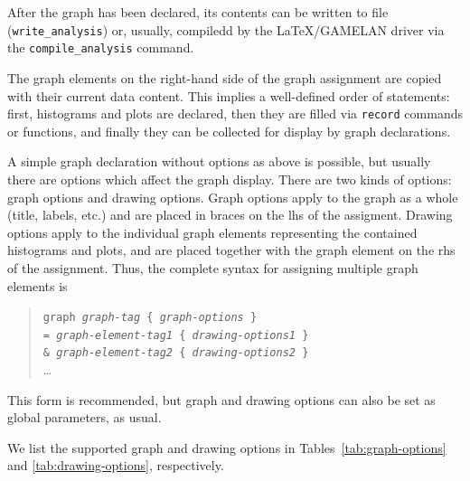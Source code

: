 \documentclass[12pt]{book}
\newcommand{\ttt}[1]{\texttt{#1}}
\begin{document}
After the graph has been declared, its contents can be written to file
(\ttt{write\_analysis}) or, usually, compiledd by the \LaTeX/GAMELAN driver
via the \ttt{compile\_analysis} command.

The graph elements on the right-hand side of the graph assignment are copied
with their current data content.  This implies a well-defined order of
statements: first, histograms and plots are declared, then they are filled via
\ttt{record} commands or functions, and finally they can be collected for
display by graph declarations.

A simple graph declaration without options as above is possible, but usually
there are options which affect the graph display.  There are two kinds of
options: graph options and drawing options.  Graph options apply to the graph
as a whole (title, labels, etc.) and are placed in braces on the lhs of the
assigment.  Drawing options apply to the individual graph elements
representing the contained histograms and plots, and are placed together with
the graph element on the rhs of the assignment.  Thus, the complete syntax for
assigning multiple graph elements is
\begin{quote}
  \begin{footnotesize}
    \ttt{graph \emph{graph-tag} \{ \emph{graph-options} \}}
\\
    \ttt{= \emph{graph-element-tag1} \{ \emph{drawing-options1} \}}
\\
    \ttt{\& \emph{graph-element-tag2} \{ \emph{drawing-options2} \}}
\\
     \ldots
  \end{footnotesize}
\end{quote}
This form is recommended, but graph and drawing options can also be set as
global parameters, as usual.

We list the supported graph and drawing options in
Tables~\ref{tab:graph-options} and \ref{tab:drawing-options}, respectively.
\end{document}
